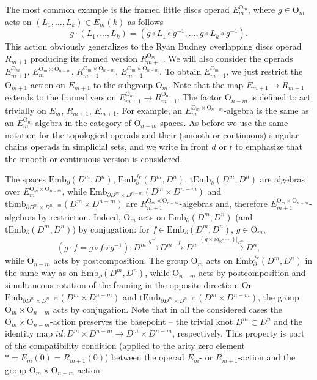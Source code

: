 \documentclass[11pt]{amsart}
\theoremstyle{definition}
\newcommand{\R}{{\mathbb R}}
\newcommand{\Embmn}{\mathrm{Emb}_\partial(D^m,D^n)}
\newcommand{\Embfrmn}{\mathrm{Emb}_\partial^{fr}(D^m,D^n)}
\newcommand{\tEmbmn}{\mathrm{tEmb}_\partial(D^m,D^n)}
\newcommand{\Emb}{\mathrm{Emb}}
\newcommand{\tEmb}{\mathrm{tEmb}}
\newcommand{\OO}{\mathrm{O}}
\numberwithin{equation}{section}
\begin{document}
The most common example is the framed little discs operad $E_m^{\OO_m}$, where $g\in\OO_m$ acts on $(L_1,\ldots,L_k)\in E_m(k)$ as follows
\[
g\cdot (L_1,\ldots,L_k)=(g\circ L_1\circ g^{-1}, \ldots,g\circ L_k\circ g^{-1}).
\]
This action obviously generalizes to the Ryan Budney overlapping discs operad $R_{m+1}$ producing its framed version $R_{m+1}^{\OO_m}$. 
We will also consider the operads $E_{m+1}^{\OO_m}$, $E_m^{\OO_m\times\OO_{n-m}}$, $R_{m+1}^{\OO_m\times \OO_{n-m}}$,
 $E_{m+1}^{\OO_m\times \OO_{n-m}}$. To obtain $E_{m+1}^{\OO_m}$, we just restrict the $\OO_{m+1}$-action on $E_{m+1}$ to the subgroup 
 $\OO_m$. Note that the map $E_{m+1}\to R_{m+1}$ extends to the framed version $E_{m+1}^{\OO_m}\to R_{m+1}^{\OO_m}$. The factor $\OO_{n-m}$ 
 is defined to act trivially on $E_m$, $R_{m+1}$, $E_{m+1}$. For example, an $E_m^{\OO_m\times\OO_{n-m}}$-algebra is the same as an 
 $E_m^{\OO_m}$-algebra in the category of $\OO_{n-m}$-spaces. As before we use the same notation for the topological operads and their (smooth or continuous) singular chains 
 operads in simplicial sets, and we write in front $d$ or $t$ to emphasize that the smooth or continuous version is considered. 
 
 The spaces $\Embmn$, $\Embfrmn$, $\tEmbmn$ are algebras over $E_m^{\OO_m\times\OO_{n-m}}$, while $\Emb_{\partial D^m\times D^{n-m}}(D^m\times D^{n-m})$ and $\tEmb_{\partial D^m\times D^{n-m}}(D^m\times D^{n-m})$ are $R_{m+1}^{\OO_m\times\OO_{n-m}}$-algebras and, therefore
$E_{m+1}^{\OO_m\times\OO_{n-m}}$-algebras by restriction. Indeed, $\OO_m$ acts on $\Embmn$ (and $\tEmbmn$) by conjugation: for $f\in\Embmn$, $g\in\OO_m$,
\[
\left(g\cdot f=g\circ f\circ g^{-1}\right)\colon D^m\xrightarrow{g^{-1}}D^m\xrightarrow{f} D^n\xrightarrow{(g\times id_{\R^{n-m}})|_{D^n}} D^n,
\]
while $\OO_{n-m}$ acts by postcomposition. The group $\OO_m$ acts on $\Embfrmn$ in the same way as on $\Embmn$, while $\OO_{n-m}$ acts 
by postcomposition and simultaneous rotation of the framing in the opposite direction. On $\Emb_{\partial D^m\times D^{n-m}}(D^m\times D^{n-m})$ and $\tEmb_{\partial D^m\times D^{n-m}}(D^m\times D^{n-m})$, the group $\OO_m\times\OO_{n-m}$ acts by conjugation. Note that in all the  considered cases
the $\OO_m\times\OO_{n-m}$-action preserves the basepoint -- the trivial knot $D^m\subset D^n$ and the identity map $id\colon D^m\times D^{n-m}\to
D^m\times D^{n-m}$, respectively. This property is part of the compatibility condition (applied to the arity zero element $*=E_m(0)=R_{m+1}(0)$) between the operad $E_m$- or $R_{m+1}$-action and the
group $\OO_m\times\OO_{n-m}$-action.
\end{document}
